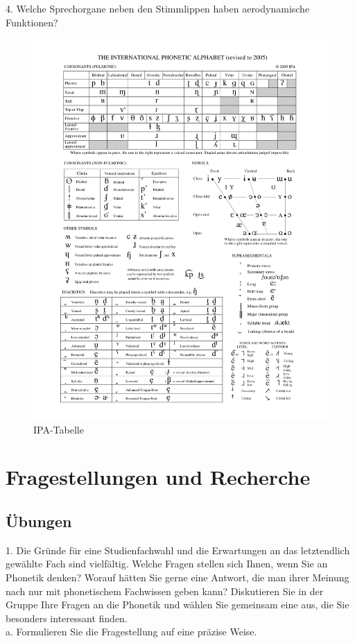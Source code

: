 \documentclass[11pt]{book}
\begin{document}
4.	Welche Sprechorgane neben den Stimmlippen haben aerodynamische Funktionen?
\begin{figure}[htbp]
\begin{center}
\includegraphics[width=\textwidth]{grafiken/sprechen/ipa}
\caption{IPA-Tabelle}
\label{fig4}
\end{center}
\end{figure}








\chapter{Fragestellungen und Recherche}


\section{Übungen}

1.	Die Gründe für eine Studienfachwahl und die Erwartungen an das letztendlich gewählte Fach sind vielfältig.  Welche Fragen stellen sich Ihnen, wenn Sie an Phonetik denken? Worauf hätten Sie gerne eine Antwort, die man ihrer Meinung nach nur mit phonetischem Fachwissen geben kann? Diskutieren Sie in der Gruppe Ihre Fragen an die Phonetik und wählen Sie gemeinsam eine aus, die Sie besonders interessant finden.\\
\newpage
a.	Formulieren Sie die Fragestellung auf eine präzise Weise.
\end{document}
